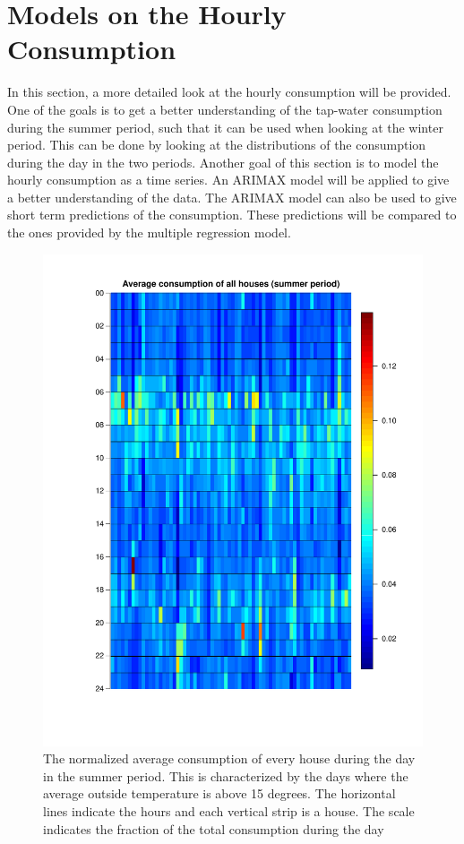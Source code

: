 \chapter{Models on the Hourly Consumption}
In this section, a more detailed look at the hourly consumption will be provided. One of the goals is to get a better understanding of the tap-water consumption during the summer period, such that it can be used when looking at the winter period. This can be done by looking at the distributions of the consumption during the day in the two periods. Another goal of this section is to model the hourly consumption as a time series. An ARIMAX model will be applied to give a better understanding of the data. The ARIMAX model can also be used to give short term predictions of the consumption. These predictions will be compared to the ones provided by the multiple regression model.


\begin{figure}
    \centering
    \includegraphics[width=\textwidth]{../../../figures/Heatmap_summer.pdf}
    \caption{The normalized average consumption of every house during the day in the summer period. This is characterized by the days where the average outside temperature is above 15 degrees. The horizontal lines indicate the hours and each vertical strip is a house. The scale indicates the fraction of the total consumption during the day}
    \label{fig: Hourcons_summer}
\end{figure}


